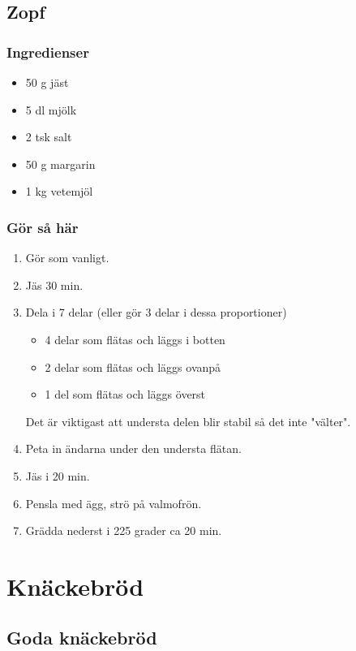 \documentclass[a4paper,11pt,twocolumn]{article}
\begin{document}
\subsection{Zopf}
\subsubsection*{Ingredienser}
\begin{itemize}[noitemsep]
    \item 50 g jäst
    \item 5 dl mjölk
    \item 2 tsk salt
    \item 50 g margarin
    \item 1 kg vetemjöl
\end{itemize}
\subsubsection*{Gör så här}
\begin{enumerate}[label=\arabic*.]
    \item Gör som vanligt.
    \item Jäs 30 min.
    \item Dela i 7 delar (eller gör 3 delar i dessa proportioner)
    \begin{itemize}
        \item 4 delar som flätas och läggs i botten
        \item 2 delar som flätas och läggs ovanpå
        \item 1 del som flätas och läggs överst
    \end{itemize}
    Det är viktigast att understa delen blir stabil så det inte "välter".
    \item Peta in ändarna under den understa flätan.
    \item Jäs i 20 min.
    \item Pensla med ägg, strö på valmofrön.
    \item Grädda nederst i 225 grader ca 20 min.
\end{enumerate}


\newpage
\section{Knäckebröd}

\subsection{Goda knäckebröd}
\end{document}
